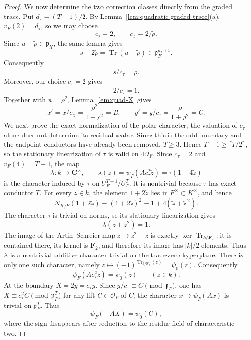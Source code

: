 \documentclass[11pt]{amsart}
\theoremstyle{definition}
\theoremstyle{remark}
\newcommand{\C}{\mathbf C}
\newcommand{\F}{\mathbf F}
\newcommand{\cO}{\mathcal O}
\newcommand{\p}{\mathfrak p}
\newcommand{\Tr}{\operatorname{Tr}}
\begin{document}
\begin{proof}
We now determine the two correction classes directly from the graded
trace.  Put $d_\tau=(T-1)/2$.  By
Lemma~\ref{lem:quadratic-graded-trace}(a), $v_F(2)=d_\tau$, so we may
choose
\begin{equation}\label{eq:quadratic-boundary-critical-elements}
 c_\tau=2,
 \qquad c_\chi=2/\widetilde\rho.
\end{equation}
Since $u-\widetilde\rho\in\p_K$, the same lemma gives
\[
 s-2\widetilde\rho=\Tr(u-\widetilde\rho)\in\p_F^{d_\tau+1}.
\]
Consequently
\begin{equation}\label{eq:quadratic-boundary-trace-class}
 \overline{s/c_\tau}=\rho.
\end{equation}
Moreover, our choice $c_\tau=2$ gives
\begin{equation}\label{eq:quadratic-boundary-two-class}
 \overline{2/c_\tau}=1.
\end{equation}
Together with $\bar n=\rho^2$, Lemma~\ref{lem:quad-X} gives
\begin{equation}\label{eq:quadratic-boundary-correction-classes}
 x'=\overline{x/c_\chi}=\frac{\rho^2}{1+\rho^2}=B,
 \qquad
 y'=\overline{y/c_\tau}=\frac{\rho}{1+\rho^2}=C.
\end{equation}
We next prove the exact normalization of the polar character; the
valuation of $c_\tau$ alone does not determine its residual scalar.
Since this is the odd boundary and the endpoint conductors have already
been removed, $T\ge3$.  Hence
$T-1\ge\lceil T/2\rceil$, so the stationary linearization of $\tau$
is valid on $4\cO_F$.  Since $c_\tau=2$ and $v_F(4)=T-1$, the map
\[
 \lambda:k\longrightarrow\C^\times,
 \qquad
 \lambda(z)=\psi_F(Ac_\tau^2\widetilde z)
            =\tau(1+4\widetilde z)
\]
is the character induced by $\tau$ on
$U_F^{T-1}/U_F^T$.  It is nontrivial because $\tau$ has exact
conductor $T$.  For every $z\in k$, the element $1+2\widetilde z$
lies in $F^\times\subset K^\times$, and hence
\[
 N_{K/F}(1+2\widetilde z)
 =(1+2\widetilde z)^2
 =1+4(\widetilde z+\widetilde z^{\,2}).
\]
The character $\tau$ is trivial on norms, so its stationary
linearization gives
\[
 \lambda(z+z^2)=1.
\]
The image of the Artin--Schreier map $z\mapsto z^2+z$ is exactly
$\ker\Tr_{k/\F_2}$: it is contained there, its kernel is $\F_2$, and
therefore its image has $|k|/2$ elements.  Thus $\lambda$ is a
nontrivial additive character trivial on the trace-zero hyperplane.
There is only one such character, namely
$z\mapsto(-1)^{\Tr_{k/\F_2}(z)}=\psi_0(z)$.  Consequently
\begin{equation}\label{eq:quadratic-tau-polar-normalization}
 \psi_F(Ac_\tau^2\widetilde z)=\psi_0(z)
 \qquad(z\in k).
\end{equation}
At the boundary $X=2y=c_\tau y$.  Since
$y/c_\tau\equiv C\pmod{\p_F}$, one has
$X\equiv c_\tau^2\widetilde C\pmod{\p_F^T}$ for any lift
$\widetilde C\in\cO_F$ of $C$; the character
$x\mapsto\psi_F(Ax)$ is trivial on $\p_F^T$.  Thus
\begin{equation}\label{eq:quadratic-boundary-elementary-class}
 \psi_F(-AX)=\psi_0(C),
\end{equation}
where the sign disappears after reduction to the residue field of
characteristic two.


\end{proof}
\end{document}
